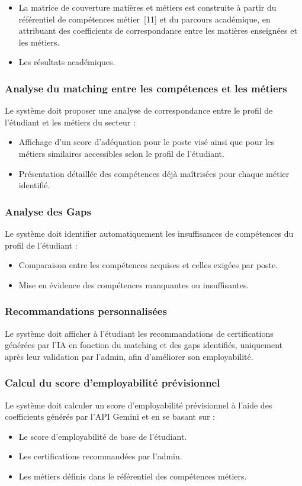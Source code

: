 \begin{itemize}
  \item La matrice de couverture matières et métiers est construite à partir du référentiel de compétences métier~[11] et du parcours académique, en attribuant des coefficients de correspondance entre les matières enseignées et les métiers. 
  \item Les résultats académiques.
\end{itemize}

\subsubsection*{Analyse du matching entre les compétences et les métiers}
Le système doit proposer une analyse de correspondance entre le profil de l'étudiant et les métiers du secteur :

\begin{itemize}
  \item Affichage d'un score d'adéquation pour le poste visé ainsi que pour les métiers similaires accessibles selon le profil de l'étudiant.
  \item Présentation détaillée des compétences déjà maîtrisées pour chaque métier identifié.
\end{itemize}

\subsubsection*{Analyse des Gaps}
Le système doit identifier automatiquement les insuffisances de compétences du profil de l’étudiant :

\begin{itemize}
  \item Comparaison entre les compétences acquises et celles exigées par poste.
  \item Mise en évidence des compétences manquantes ou insuffisantes.
\end{itemize}

\subsubsection*{Recommandations personnalisées}
Le système doit afficher à l'étudiant les recommandations de certifications générées par l'IA en fonction du matching et des gaps identifiés, uniquement après leur validation par l'admin, afin d’améliorer son employabilité. 

\subsubsection*{Calcul du score d’employabilité prévisionnel}
Le système doit calculer un score d’employabilité prévisionnel à l'aide des coefficients générés par l’API Gemini et en se basant sur :
\begin{itemize}
  \item Le score d’employabilité de base de l’étudiant.
  \item Les certifications recommandées par l’admin.
  \item Les métiers définis dans le référentiel des compétences métiers. 
\end{itemize}

